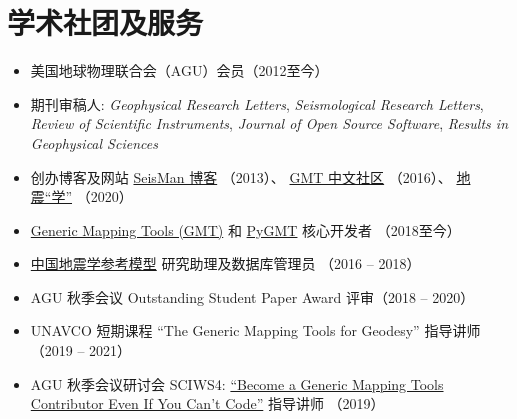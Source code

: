 \section*{学术社团及服务}

\begin{itemize}
\item 美国地球物理联合会（AGU）会员（2012至今）
\item 期刊审稿人: \textit{Geophysical Research Letters},
				  \textit{Seismological Research Letters},
				  \textit{Review of Scientific Instruments},
				  \textit{Journal of Open Source Software},
				  \textit{Results in Geophysical Sciences}
\item 创办博客及网站
	  \href{https://blog.seisman.info}{SeisMan 博客} （2013）、
	  \href{http://gmt-china.org/}{GMT 中文社区} （2016）、
	  \href{https://seismo-learn.org/}{地震``学''} （2020）
\item \href{https://github.com/GenericMappingTools/gmt}{Generic Mapping Tools (GMT)} 和 \href{https://github.com/GenericMappingTools/pygmt}{PyGMT} 核心开发者 （2018至今）
\item \href{http://chinageorefmodel.org/}{中国地震学参考模型} 研究助理及数据库管理员 （2016 -- 2018）
\item AGU 秋季会议 Outstanding Student Paper Award 评审（2018 -- 2020）
\item UNAVCO 短期课程 ``The Generic Mapping Tools for Geodesy'' 指导讲师（2019 -- 2021）
\item AGU 秋季会议研讨会 SCIWS4: \href{https://www.agu.org/Events/SCIWS4-Generic-Mapping-Tools}{``Become a Generic Mapping Tools Contributor Even If You Can't Code''} 指导讲师 （2019）
\end{itemize}
